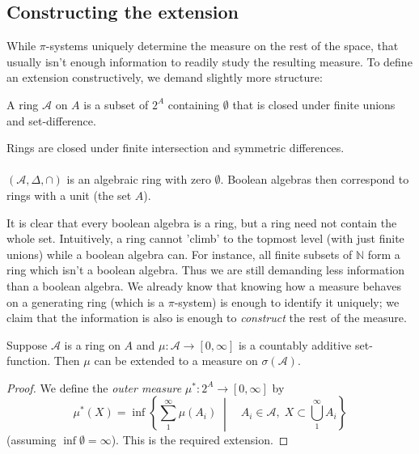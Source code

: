 \documentclass[9pt]{report}
\newlength{\tindent}
\newtheorem[L]{theorem}{Theorem}[chapter]
\newtheorem[L,nocut]{definition}[theorem]{Definition}
\newtheorem[S,nounderline]{remark}[theorem]{Remarks}
\newenvironment{Proof}{ 
	\\ \setlength{\parindent}{\tindent}
\begin{proof}}
{\end{proof} \setlength{\parindent}{0pt}}
\begin{document}
\subsection{Constructing the extension} 

While \(\pi\)-systems uniquely determine the measure on the rest of the space, that usually isn't enough information to readily study the resulting measure. To define an extension constructively, we demand slightly more structure:

\begin{definition}[Ring]
	A ring \(\mathcal{A}\) on \(A\) is a subset of \(2^A\) containing \(\emptyset\) that is closed under finite unions and set-difference.
\end{definition}

\begin{remark}
	Rings are closed under finite intersection and symmetric differences. \\ \\ 
	\((\mathcal{A}, \Delta, \cap)\) is an algebraic ring with zero \(\emptyset\). Boolean algebras then correspond to rings with a unit (the set \(A\)).
\end{remark}

It is clear that every boolean algebra is a ring, but a ring need not contain the whole set. Intuitively, a ring cannot 'climb' to the topmost level (with just finite unions) while a boolean algebra can. For instance, all finite subsets of \(\mathbb{N}\) form a ring which isn't a boolean algebra. Thus we are still demanding less information than a boolean algebra. We already know that knowing how a measure behaves on a generating ring (which is a \(\pi\)-system) is enough to identify it uniquely; we claim that the information is also is enough to \emph{construct} the rest of the measure.

\begin{theorem}
	Suppose \(\mathcal{A}\) is a ring on \(A\) and \(\mu: \mathcal{A}\rightarrow[0,\infty]\) is a countably additive set-function. Then \(\mu\) can be extended to a measure on \(\sigma(\mathcal{A})\).
	\begin{Proof}
		We define the \emph{outer measure} \(\mu^*: 2^A\rightarrow [0,\infty] \) by 
		\[\mu^*(X) = \inf\left\{\sum_1^\infty \mu(A_i) \; \middle| \quad A_i \in \mathcal{A}, \; X \subset \bigcup_1^\infty A_i\right\}\]
		(assuming \(\inf \emptyset = \infty\)). This is the required extension. 
	\end{Proof}
\end{theorem} 
\end{document}
